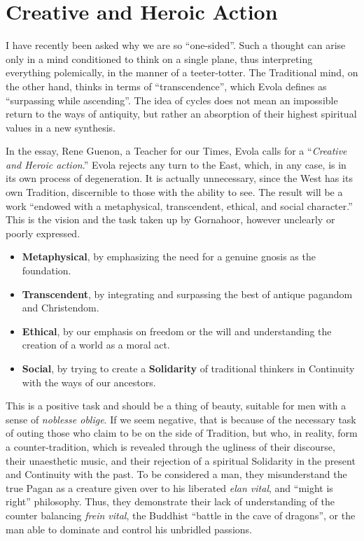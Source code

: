 \section{Creative and Heroic Action}

I have recently been asked why we are so ``one-sided''. Such a thought can arise only in a mind conditioned to think on a single plane, thus interpreting everything polemically, in the manner of a teeter-totter. The Traditional mind, on the other hand, thinks in terms of ``transcendence'', which Evola defines as ``surpassing while ascending''. The idea of cycles does not mean an impossible return to the ways of antiquity, but rather an absorption of their highest spiritual values in a new synthesis.

In the essay, Rene Guenon, a Teacher for our Times, Evola calls for a ``\emph{Creative and Heroic action}.'' Evola rejects any turn to the East, which, in any case, is in its own process of degeneration. It is actually unnecessary, since the West has its own Tradition, discernible to those with the ability to see. The result will be a work ``endowed with a metaphysical, transcendent, ethical, and social character.'' This is the vision and the task taken up by Gornahoor, however unclearly or poorly expressed.

\begin{itemize}


\item \textbf{Metaphysical}, by emphasizing the need for a genuine gnosis as the foundation.

\item \textbf{Transcendent}, by integrating and surpassing the best of antique pagandom and Christendom.

\item \textbf{Ethical}, by our emphasis on freedom or the will and understanding the creation of a world as a moral act.

\item \textbf{Social}, by trying to create a \textbf{Solidarity} of traditional thinkers in Continuity with the ways of our ancestors.
\end{itemize}

This is a positive task and should be a thing of beauty, suitable for men with a sense of \emph{noblesse oblige}. If we seem negative, that is because of the necessary task of outing those who claim to be on the side of Tradition, but who, in reality, form a counter-tradition, which is revealed through the ugliness of their discourse, their unaesthetic music, and their rejection of a spiritual Solidarity in the present and Continuity with the past. To be considered a man, they misunderstand the true Pagan as a creature given over to his liberated \emph{elan vital}, and ``might is right'' philosophy. Thus, they demonstrate their lack of understanding of the counter balancing \emph{frein vital}, the Buddhist ``battle in the cave of dragons'', or the man able to dominate and control his unbridled passions.

